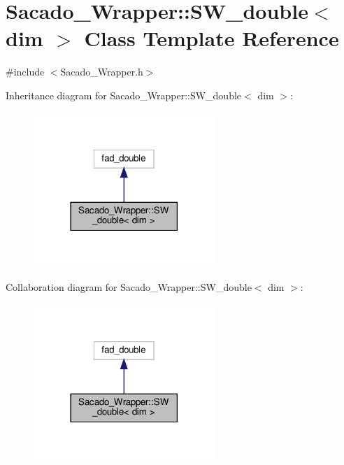 \hypertarget{classSacado__Wrapper_1_1SW__double}{}\section{Sacado\+\_\+\+Wrapper\+:\+:S\+W\+\_\+double$<$ dim $>$ Class Template Reference}
\label{classSacado__Wrapper_1_1SW__double}


{\ttfamily \#include $<$Sacado\+\_\+\+Wrapper.\+h$>$}



Inheritance diagram for Sacado\+\_\+\+Wrapper\+:\+:S\+W\+\_\+double$<$ dim $>$\+:\nopagebreak
\begin{figure}[H]
\begin{center}
\leavevmode
\includegraphics[width=194pt]{classSacado__Wrapper_1_1SW__double__inherit__graph}
\end{center}
\end{figure}


Collaboration diagram for Sacado\+\_\+\+Wrapper\+:\+:S\+W\+\_\+double$<$ dim $>$\+:\nopagebreak
\begin{figure}[H]
\begin{center}
\leavevmode
\includegraphics[width=194pt]{classSacado__Wrapper_1_1SW__double__coll__graph}
\end{center}
\end{figure}
